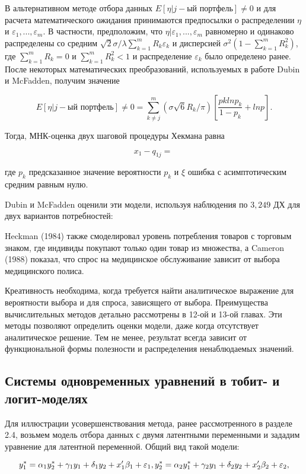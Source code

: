 В альтернативном методе отбора данных $E[\eta|j-\text{ый портфель}]{\neq}0$ и для расчета математического ожидания принимаются предпосылки о распределении $\eta$ и $\varepsilon_1,...,\varepsilon_m$. В частности, предположим, что $\eta|\varepsilon_1,...,\varepsilon_m$ равномерно и одинаково распределены со средним $\sqrt{2}\sigma/\lambda\sum_{k=1}^{m}R_{k}\varepsilon_k$ и дисперсией $\sigma^{2}(1-\sum_{k=1}^m R_k^2)$, где $\sum_{k=1}^m R_k=0$ и $\sum_{k=1}^m R_k^2<1$ и распределение $\varepsilon_k$ было определено ранее. После некоторых математических преобразований, используемых в работе Dubin и McFadden, получим значение 

\[
E[\eta|j-\text{ый портфель}]{\neq}0=\sum_{k \neq j}^m
(\sigma\sqrt{6}R_k/\pi)[\dfrac{p{k}ln{p_k}}{1-p_k}+ln{p}].
\]

Тогда, МНК-оценка двух шаговой процедуры Хекмана равна 

\[
x_1-q_{1j}=\
\]

где $p_k$ предсказанное значение вероятности $p_k$ и $\xi$ ошибка с асимптотическим средним равным нулю.


Dubin и McFadden оценили эти модели, используя наблюдения по $3,249$ ДХ для двух вариантов потребностей: 

Heckman (1984) также смоделировал уровень потребления товаров с торговым знаком, где индивиды покупают только один товар из множества, а Cameron (1988) показал, что спрос на медицинское обслуживание зависит от выбора медицинского полиса.

Креативность необходима, когда требуется найти аналитическое выражение для вероятности выбора и для спроса, зависящего от выбора. Преимущества вычислительных методов детально рассмотрены в 12-ой и 13-ой главах. Эти методы позволяют определить оценки модели, даже когда отсутствует аналитическое решение. Тем не менее, результат всегда зависит от функциональной формы полезности и распределения ненаблюдаемых значений.

\subsection{Системы одновременных уравнений в тобит- и логит-моделях}

Для иллюстрации усовершенствования метода, ранее рассмотренного в разделе 2.4, возьмем модель отбора данных с двумя латентными переменными и зададим уравнение для латентной переменной. Общий вид такой модели:

\begin{equation}
y_1^{*}=\alpha_1y_2^{*}+\gamma_1y_1+\delta_1y_2+x'_1\beta_1+\varepsilon_1,\\
y_2^{*}=\alpha_2y_1^{*}+\gamma_2y_1+\delta_2y_2+x_2'\beta_2+\varepsilon_2,
\end{equation}

